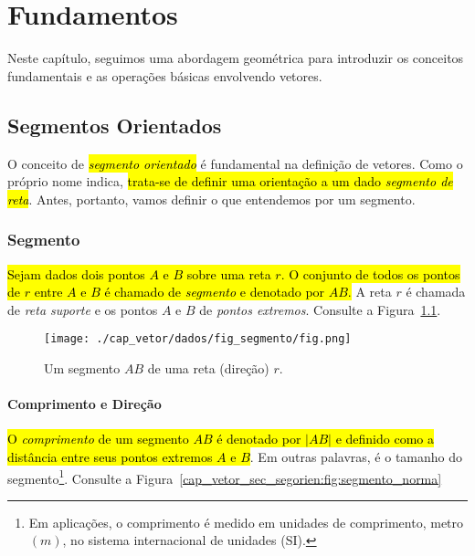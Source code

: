 
\chapter{Fundamentos}\label{cap_vetor}

Neste capítulo, seguimos uma abordagem geométrica para introduzir os conceitos fundamentais e as operações básicas envolvendo vetores.

\section{Segmentos Orientados}\label{cap_vetor_sec_segorien}

O conceito de \hl{\emph{segmento orientado}} é fundamental na definição de vetores. Como o próprio nome indica, \hl{trata-se de definir uma orientação a um dado \emph{segmento de reta}}. Antes, portanto, vamos definir o que entendemos por um segmento.

\subsection{Segmento}

\hl{Sejam dados dois pontos $A$ e $B$ sobre uma reta $r$. O conjunto de todos os pontos de $r$ entre $A$ e $B$ é chamado de \emph{segmento} e denotado por $AB$.} A reta $r$ é chamada de \emph{reta suporte} e os pontos $A$ e $B$ de \emph{pontos extremos}. Consulte a Figura~\ref{cap_vetor_sec_segorien:fig:segmento}.

\begin{figure}[h]
  \centering
  \texttt{[image: ./cap\_vetor/dados/fig\_segmento/fig.png]}
  \caption{Um segmento $AB$ de uma reta (direção) $r$.}
  \label{cap_vetor_sec_segorien:fig:segmento}
\end{figure}

\subsubsection{Comprimento e Direção}

\hl{O \emph{comprimento} de um segmento $AB$ é denotado por $|AB|$ e definido como a distância entre seus pontos extremos $A$ e $B$}. Em outras palavras, é o tamanho do segmento\footnote{Em aplicações, o comprimento é medido em unidades de comprimento, metro $(m)$, no sistema internacional de unidades (SI).}. Consulte a Figura~\ref{cap_vetor_sec_segorien:fig:segmento_norma}

